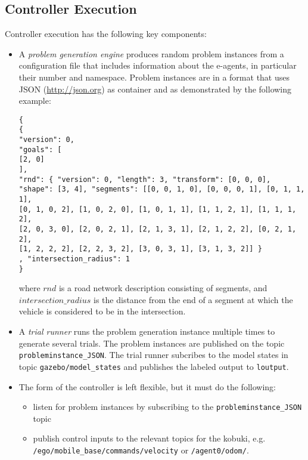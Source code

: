 \documentclass{amsart}
\theoremstyle{definition}
\begin{document}


\subsection{Controller Execution}
Controller execution has the following key components:

\begin{itemize}
\item A \emph{problem generation engine} produces random problem instances from a 
configuration file that includes information about the e-agents, in particular their number
and namespace. 
Problem instances are in a format that uses JSON (\url{http://json.org}) as container and as demonstrated by the following example:
\begin{small}
\begin{verbatim}
{
{
"version": 0,
"goals": [
[2, 0]
],
"rnd": { "version": 0, "length": 3, "transform": [0, 0, 0], 
"shape": [3, 4], "segments": [[0, 0, 1, 0], [0, 0, 0, 1], [0, 1, 1, 1], 
[0, 1, 0, 2], [1, 0, 2, 0], [1, 0, 1, 1], [1, 1, 2, 1], [1, 1, 1, 2], 
[2, 0, 3, 0], [2, 0, 2, 1], [2, 1, 3, 1], [2, 1, 2, 2], [0, 2, 1, 2], 
[1, 2, 2, 2], [2, 2, 3, 2], [3, 0, 3, 1], [3, 1, 3, 2]] }
, "intersection_radius": 1
}
\end{verbatim}
\end{small}

where $rnd$ is a road network description consisting of segments, and $intersection\_radius$
is the distance from the end of a segment at which the vehicle is considered to be in the intersection. 

\item A \emph{trial runner} runs the problem generation instance multiple times to generate
several trials. The problem instances are published on the topic \texttt{probleminstance\_JSON}.
The trial runner subcribes to the model states in topic \texttt{gazebo/model\_states} and publishes
the labeled output to \texttt{loutput}. 

\item The form of the controller is left flexible, but it must do the following:

\begin{itemize}
\item listen for problem instances by subscribing to the \texttt{probleminstance\_JSON} topic
\item publish control inputs to the relevant topics for the kobuki, e.g. \\
\texttt{/ego/mobile\_base/commands/velocity} or \texttt{/agent0/odom/}.
\end{itemize}

\end{itemize}
\end{document}
